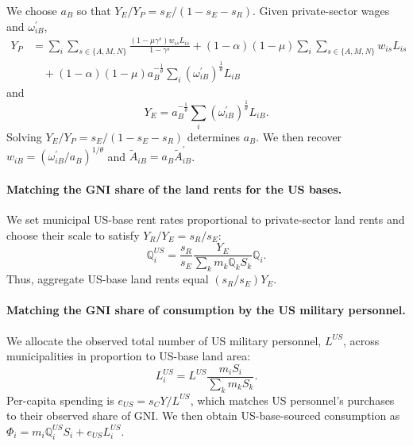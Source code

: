 \documentclass[12pt, unicode, a4paper]{article}
\newcommand{\1}{\mbox{1}\hspace{-0.25em}\mbox{l}} %
\begin{document}
We choose $a_B$ so that $Y_E/Y_P=s_E/(1-s_E-s_R)$. Given private-sector wages and $\omega_{iB}^\prime$,
\begin{equation*}
    \begin{split}
        Y_P&=\sum_i \sum_{s \in \{ A,M,N \}} \frac{(1-\mu\gamma^s)w_{is}L_{is}}{1-\gamma^s}+(1-\alpha)(1-\mu)\sum_i \sum_{s \in \{ A,M,N \}} w_{is}L_{is}\\
        &\quad +(1-\alpha)(1-\mu)a_B^{-\frac{1}{\theta}} \sum_i (\omega_{iB}^\prime)^{\frac{1}{\theta}}L_{iB}
    \end{split}
\end{equation*}
and
\begin{equation*}
    Y_E=a_B^{-\frac{1}{\theta}} \sum_i (\omega_{iB}^\prime)^{\frac{1}{\theta}}L_{iB} .
\end{equation*}
Solving $Y_E/Y_P=s_E/(1-s_E-s_R)$ determines $a_B$. We then recover $w_{iB}=(\omega_{iB}^\prime/a_B)^{1/\theta}$ and $\widetilde{A}_{iB}=a_B\widetilde{A}_{iB}^\prime$.

\paragraph{Matching the GNI share of the land rents for the US bases.}

We set municipal US-base rent rates proportional to private-sector land rents and choose their scale to satisfy $Y_R/Y_E=s_R/s_E$:
\begin{equation*}
    \mathbb{Q}_i^{US}
    =\frac{s_R}{s_E}\frac{Y_E}{\sum_k m_k\mathbb{Q}_k S_k}\mathbb{Q}_i.
\end{equation*}
Thus, aggregate US-base land rents equal $(s_R/s_E)Y_E$.

\paragraph{Matching the GNI share of consumption by the US military personnel.}

We allocate the observed total number of US military personnel, $L^{US}$, across municipalities in proportion to US-base land area:
\begin{equation*}
    L_i^{US}=L^{US}\frac{m_iS_i}{\sum_k m_kS_k}.
\end{equation*}
Per-capita spending is $e_{US}=s_CY/L^{US}$, which matches US personnel's purchases to their observed share of GNI. We then obtain US-base-sourced consumption as $\Phi_i=m_i\mathbb{Q}_i^{US}S_i+e_{US}L_i^{US}$.

\clearpage
\end{document}
